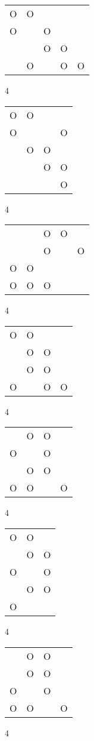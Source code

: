 \begin{tabular}{|m{0.2cm}m{0.2cm}m{0.2cm}m{0.2cm}m{0.2cm}|}\hline
O&O& & & \\
O& &O& & \\
 & &O&O& \\
 &O& &O&O\\
\hline\end{tabular}4
\begin{tabular}{|m{0.2cm}m{0.2cm}m{0.2cm}m{0.2cm}|}\hline
O&O& & \\
O& & &O\\
 &O&O& \\
 & &O&O\\
 & & &O\\
\hline\end{tabular}4
\begin{tabular}{|m{0.2cm}m{0.2cm}m{0.2cm}m{0.2cm}m{0.2cm}|}\hline
 & &O&O& \\
 & &O& &O\\
O&O& & & \\
O&O&O& & \\
\hline\end{tabular}4
\begin{tabular}{|m{0.2cm}m{0.2cm}m{0.2cm}m{0.2cm}|}\hline
O&O& & \\
 &O&O& \\
 &O&O& \\
O& &O&O\\
\hline\end{tabular}4
\begin{tabular}{|m{0.2cm}m{0.2cm}m{0.2cm}m{0.2cm}|}\hline
 &O&O& \\
O& &O& \\
 &O&O& \\
O&O& &O\\
\hline\end{tabular}4
\begin{tabular}{|m{0.2cm}m{0.2cm}m{0.2cm}|}\hline
O&O& \\
 &O&O\\
O& &O\\
 &O&O\\
O& & \\
\hline\end{tabular}4
\begin{tabular}{|m{0.2cm}m{0.2cm}m{0.2cm}m{0.2cm}|}\hline
 &O&O& \\
 &O&O& \\
O& &O& \\
O&O& &O\\
\hline\end{tabular}4

